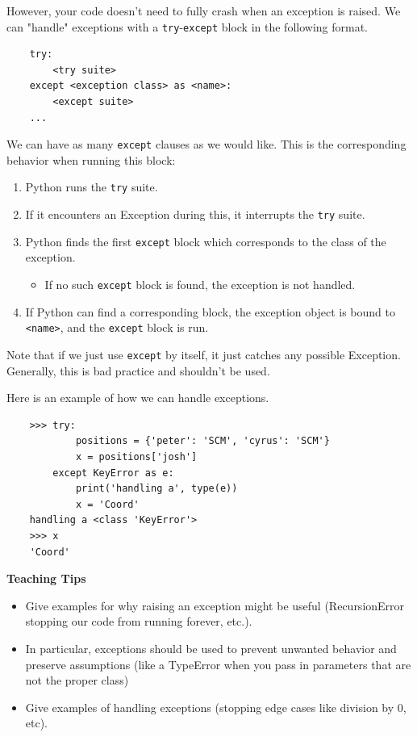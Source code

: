 However, your code doesn't need to fully crash when an exception is raised.
We can "handle" exceptions with a \lstinline{try}-\lstinline{except} block in the following format.
\begin{lstlisting}
    try:
        <try suite>
    except <exception class> as <name>:
        <except suite>
    ...
\end{lstlisting}
We can have as many \lstinline{except} clauses as we would like. This is the corresponding behavior when running this block:

\begin{enumerate}
    \item Python runs the \lstinline{try} suite.
    \item If it encounters an Exception during this, it interrupts the \lstinline{try} suite.
    \item Python finds the first \lstinline{except} block which corresponds to the class of the exception.
        \begin{itemize}
            \item If no such \lstinline{except} block is found, the exception is not handled.
        \end{itemize}
    \item If Python can find a corresponding block, the exception object is bound to \lstinline{<name>}, and the \lstinline{except} block is run.
\end{enumerate}

Note that if we just use \lstinline{except} by itself, it just catches any possible Exception. Generally, this is bad practice and shouldn't be used.

Here is an example of how we can handle exceptions.
\begin{lstlisting}
    >>> try:
            positions = {'peter': 'SCM', 'cyrus': 'SCM'}
            x = positions['josh']
        except KeyError as e:
            print('handling a', type(e))
            x = 'Coord'
    handling a <class 'KeyError'>
    >>> x
    'Coord'
\end{lstlisting}

\begin{blocksection}
\begin{guide}
\textbf{Teaching Tips}
\begin{itemize}
    \item Give examples for why raising an exception might be useful (RecursionError stopping our code from running forever, etc.).
    \item In particular, exceptions should be used to prevent unwanted behavior and preserve assumptions (like a TypeError when you pass in parameters that are not the proper class)
    \item Give examples of handling exceptions (stopping edge cases like division by 0, etc).
\end{itemize}
\end{guide}
\end{blocksection}